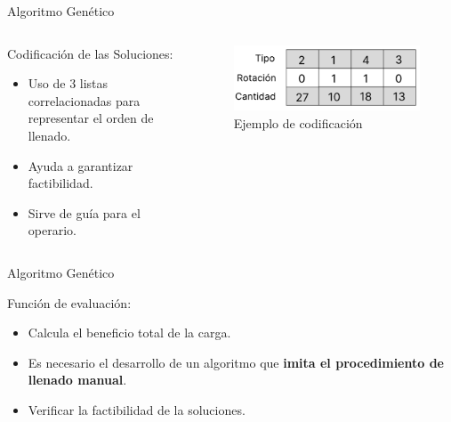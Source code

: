 \documentclass[handout]{beamer}
\begin{document}
\begin{frame}{Algoritmo Genético}
    \begin{columns}
        \begin{column}{0.6\textwidth}
            \begin{exampleblock}{Codificación de las Soluciones:}
                \begin{itemize}[<+-| alert@+>]
                    \item Uso de 3 listas correlacionadas para representar el orden de llenado.
                    \item Ayuda a garantizar factibilidad.
                    \item Sirve de guía para el operario.
                \end{itemize}
            \end{exampleblock}
        \end{column}
        \begin{column}{0.4\textwidth}
            \begin{figure}
                \centering
                \includegraphics[width=1\textwidth]{pic/codificacion.png}
                \caption*{Ejemplo de codificación}
                \label{fig:codificacion}
            \end{figure}
        \end{column}
    \end{columns}
\end{frame}

\begin{frame}{Algoritmo Genético}
    \begin{exampleblock}{Función de evaluación:}
        \begin{itemize}[<+-| alert@+>]
            \item Calcula el beneficio total de la carga.
            \item Es necesario el desarrollo de un algoritmo que \textbf{imita el procedimiento de llenado manual}.
            \item Verificar la factibilidad de la soluciones.
        \end{itemize}
    \end{exampleblock}
\end{frame}
\end{document}
